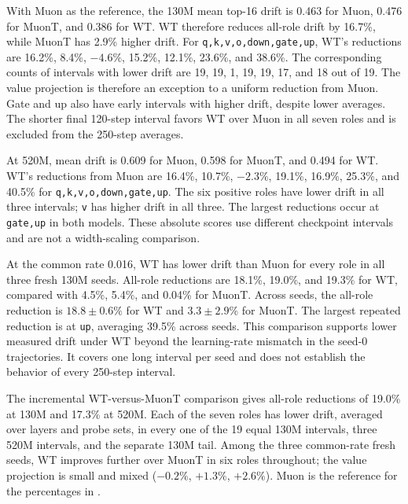 With Muon as the reference, the 130M mean top-16 drift is 0.463 for Muon, 0.476 for MuonT, and 0.386 for WT. WT therefore reduces all-role drift by 16.7\%, while MuonT has 2.9\% higher drift. For \texttt{q,k,v,o,down,gate,up}, WT's reductions are 16.2\%, 8.4\%, $-4.6\%$, 15.2\%, 12.1\%, 23.6\%, and 38.6\%. The corresponding counts of intervals with lower drift are 19, 19, 1, 19, 19, 17, and 18 out of 19. The value projection is therefore an exception to a uniform reduction from Muon. Gate and up also have early intervals with higher drift, despite lower averages. The shorter final 120-step interval favors WT over Muon in all seven roles and is excluded from the 250-step averages.

At 520M, mean drift is 0.609 for Muon, 0.598 for MuonT, and 0.494 for WT. WT's reductions from Muon are 16.4\%, 10.7\%, $-2.3\%$, 19.1\%, 16.9\%, 25.3\%, and 40.5\% for \texttt{q,k,v,o,down,gate,up}. The six positive roles have lower drift in all three intervals; \texttt{v} has higher drift in all three. The largest reductions occur at \texttt{gate,up} in both models. These absolute scores use different checkpoint intervals and are not a width-scaling comparison.

At the common rate 0.016, WT has lower drift than Muon for every role in all three fresh 130M seeds. All-role reductions are 18.1\%, 19.0\%, and 19.3\% for WT, compared with 4.5\%, 5.4\%, and 0.04\% for MuonT. Across seeds, the all-role reduction is $18.8\pm0.6\%$ for WT and $3.3\pm2.9\%$ for MuonT. The largest repeated reduction is at \texttt{up}, averaging 39.5\% across seeds. This comparison supports lower measured drift under WT beyond the learning-rate mismatch in the seed-0 trajectories. It covers one long interval per seed and does not establish the behavior of every 250-step interval.

The incremental WT-versus-MuonT comparison gives all-role reductions of 19.0\% at 130M and 17.3\% at 520M. Each of the seven roles has lower drift, averaged over layers and probe sets, in every one of the 19 equal 130M intervals, three 520M intervals, and the separate 130M tail. Among the three common-rate fresh seeds, WT improves further over MuonT in six roles throughout; the value projection is small and mixed ($-0.2\%$, $+1.3\%$, $+2.6\%$). Muon is the reference for the percentages in .



